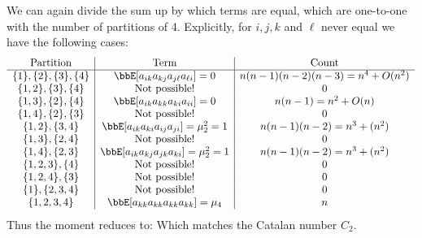 We can again divide the sum up by which terms are equal, which are one-to-one with the number of partitions of 4. Explicitly, for $i,j, k$ and $\ensuremath{\ell}$  never equal we have the following cases:
\[
\begin{array}{c | c | c}
\hbox{Partition} & \hbox{Term} & \hbox{Count} \\
\hline
\{1\}, \{2\}, \{3\}, \{4\} & \ensuremath{\bbE}[a_{ik} a_{kj} a_{j\ensuremath{\ell}} a_{\ensuremath{\ell}i}] = 0 & n (n-1)(n-2)(n-3) = n^4 + O(n^2) \\
\{1,2\}, \{3\}, \{4\} & \hbox{Not possible!} & 0 \\
\{1,3\}, \{2\}, \{4\} & \ensuremath{\bbE}[a_{ik} a_{kk} a_{ki} a_{ii}] = 0 & n (n-1) = n^2 + O(n) \\
\{1,4\}, \{2\}, \{3\} & \hbox{Not possible!} & 0 \\
\{1,2\}, \{3,4\} & \ensuremath{\bbE}[a_{ik} a_{ki} a_{ij} a_{ji}] = \ensuremath{\mu}_2^2 = 1 & n (n-1)(n-2) = n^3 + (n^2) \\
\{1,3\}, \{2,4\} & \hbox{Not possible!} & 0 \\
\{1,4\}, \{2,3\} & \ensuremath{\bbE}[a_{ik} a_{kj} a_{jk} a_{ki}] = \ensuremath{\mu}_2^2 = 1 & n (n-1)(n-2) = n^3 + (n^2) \\
\{1,2,3\}, \{4\} & \hbox{Not possible!} & 0 \\
\{1,2,4\}, \{3\} & \hbox{Not possible!} & 0 \\
\{1\}, \{2,3,4\} & \hbox{Not possible!} & 0 \\
\{1,2,3,4\} & \ensuremath{\bbE}[a_{kk} a_{kk} a_{kk} a_{kk}] = \ensuremath{\mu}_4 & n
\end{array}
\]
Thus the moment reduces to:
Which matches the Catalan number $C_2$. 

